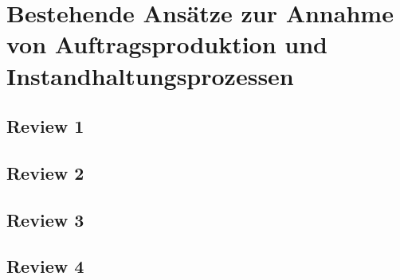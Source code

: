 \chapter{Bestehende Ansätze zur Annahme von Auftragsproduktion und Instandhaltungsprozessen}
\setcounter{footnote}{4}  %

\section{Review 1}
\section{Review 2}
\section{Review 3}
\section{Review 4}
